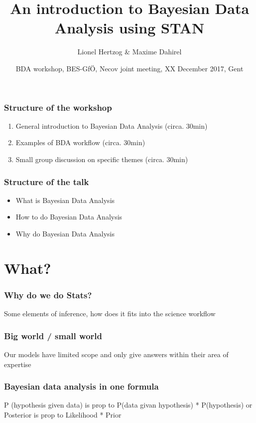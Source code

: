 \documentclass{beamer}
\title{An introduction to Bayesian Data Analysis using STAN}
\subtitle{}
\author{Lionel Hertzog \& Maxime Dahirel}
\date{BDA workshop, BES-Gf\"{O}, Necov joint meeting, XX December 2017, Gent}
\begin{document}
 
 \frame{\titlepage}
 
 
\begin{frame}
 \frametitle{\bf Structure of the workshop}
  \begin{enumerate}
   \item General introduction to Bayesian Data Analysis (circa. 30min)
   \item Examples of BDA workflow (circa. 30min)
   \item Small group discussion on specific themes (circa. 30min)
  \end{enumerate}

 
 \end{frame}
 
\begin{frame}
 \frametitle{\bf Structure of the talk}
  \begin{itemize}
   \item What is Bayesian Data Analysis
   \item How to do Bayesian Data Analysis
   \item Why do Bayesian Data Analysis
  \end{itemize}

 
 \end{frame} 
 
 
\section*{What?} 
 
 \begin{frame}
  \frametitle{\bf Why do we do Stats?}
  
  Some elements of inference, how does it fits into the science workflow
  
 \end{frame}

  \begin{frame}
  \frametitle{\bf Big world / small world}
  
  Our models have limited scope and only give answers within their area of expertise
  
 \end{frame}
 
  \begin{frame}
  \frametitle{\bf Bayesian data analysis in one formula}
  
  P (hypothesis given data) is prop to P(data givan hypothesis) * P(hypothesis) or
  Posterior  is prop to Likelihood * Prior
  
 \end{frame}
 
\end{document}
